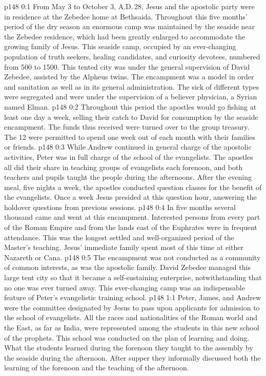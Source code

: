 \author{Midwayer Commission}
\vs p148 0:1 From May 3 to October 3, A.D.\,28, Jesus and the apostolic party were in residence at the Zebedee home at Bethsaida. Throughout this five months’ period of the dry season an enormous camp was maintained by the seaside near the Zebedee residence, which had been greatly enlarged to accommodate the growing family of Jesus. This seaside camp, occupied by an ever\hyp{}changing population of truth seekers, healing candidates, and curiosity devotees, numbered from 500 to 1500. This tented city was under the general supervision of David Zebedee, assisted by the Alpheus twins. The encampment was a model in order and sanitation as well as in its general administration. The sick of different types were segregated and were under the supervision of a believer physician, a Syrian named Elman.
\vs p148 0:2 Throughout this period the apostles would go fishing at least one day a week, selling their catch to David for consumption by the seaside encampment. The funds thus received were turned over to the group treasury. The 12 were permitted to spend one week out of each month with their families or friends.
\vs p148 0:3 While Andrew continued in general charge of the apostolic activities, Peter was in full charge of the school of the evangelists. The apostles all did their share in teaching groups of evangelists each forenoon, and both teachers and pupils taught the people during the afternoons. After the evening meal, five nights a week, the apostles conducted question classes for the benefit of the evangelists. Once a week Jesus presided at this question hour, answering the holdover questions from previous sessions.
\vs p148 0:4 In five months several thousand came and went at this encampment. Interested persons from every part of the Roman Empire and from the lands east of the Euphrates were in frequent attendance. This was the longest settled and well\hyp{}organized period of the Master’s teaching. Jesus’ immediate family spent most of this time at either Nazareth or Cana.
\vs p148 0:5 The encampment was not conducted as a community of common interests, as was the apostolic family. David Zebedee managed this large tent city so that it became a self\hyp{}sustaining enterprise, notwithstanding that no one was ever turned away. This ever\hyp{}changing camp was an indispensable feature of Peter’s evangelistic training school.
\vs p148 1:1 Peter, James, and Andrew were the committee designated by Jesus to pass upon applicants for admission to the school of evangelists. All the races and nationalities of the Roman world and the East, as far as India, were represented among the students in this new school of the prophets. This school was conducted on the plan of learning and doing. What the students learned during the forenoon they taught to the assembly by the seaside during the afternoon. After supper they informally discussed both the learning of the forenoon and the teaching of the afternoon.
